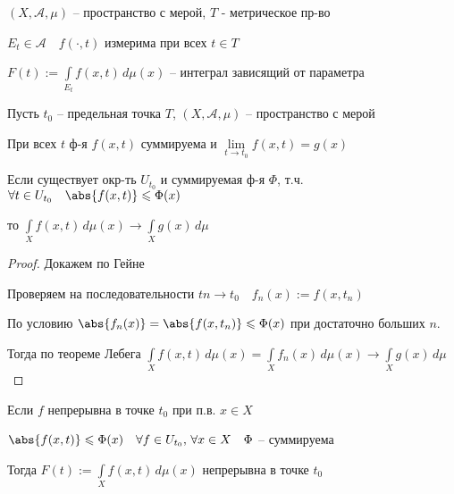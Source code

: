 
\begin{definition}\thmslashn
	
	$(X, \mathcal{A}, \mu)$ -- пространство с  мерой, $T$ - метрическое пр-во
	
	$E_t \in \mathcal{A} \quad f(\cdot, t)$ измерима при всех $t \in T$
	
	$F(t):= \int\limits_{E_t} f(x, t) \,d\mu (x)$ -- интеграл зависящий от параметра
	
\end{definition}

\begin{theorem}\thmslashn
	
	Пусть $t_0$ -- предельная точка $T$, $(X, \mathcal{A}, \mu)$ -- пространство с  мерой
	
	При всех $t$ ф-я $f(x, t)$ суммируема и $\lim\limits_{t\to t_0}f(x, t) = g(x)$
	
	Если существует окр-ть $U_{t_0}$ и суммируемая ф-я $\Phi$, т.ч. $\forall t \in U_{t_0}\quad \abs{f(x, t)} \leqslant \Phi(x)$
	
	то $\int\limits_{X} f(x, t) \,d\mu (x) \to \int\limits_{X} g(x)\,d\mu$
	
\end{theorem}

\begin{proof}\thmslashn
	
	Докажем по Гейне
	
	Проверяем на последовательности $tn \to t_0 \quad f_n(x) := f(x, t_n)$
	
	По условию $\abs{f_n(x)} = \abs{f(x, t_n)} \leqslant \Phi(x)$ при достаточно больших $n$. 
	
	Тогда по теореме Лебега $\int\limits_{X} f(x, t) \,d\mu (x) = \int\limits_{X} f_n(x) \,d\mu (x)\to \int\limits_{X} g(x)\,d\mu$ 
	
\end{proof}

\begin{consequence}\thmslashn
	
	Если $f$ непрерывна в точке $t_0$ при п.в. $x \in X$
	
	$\abs{f(x, t)} \leqslant \Phi(x) \quad \forall f\in U_{t_0},\, \forall x \in X \quad \Phi$ -- суммируема
	
	Тогда $F(t) := \int\limits_{X} f(x, t) \,d\mu (x)$ непрерывна в точке $t_0$
	
\end{consequence}

